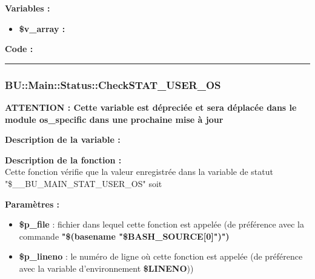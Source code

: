 \documentclass[a4paper,10pt]{article}
\begin{document}
\begin{justify}
    \textbf{Variables :}

    \begin{itemize}
        \item \textbf{\color{orange}\$v\_array\color{white} :}
    \end{itemize}
\end{justify}

\begin{justify}
    \textbf{Code :}
\end{justify}



\color{blue}\par\noindent\rule{\textwidth}{0.4pt}\color{white}

\color{blue}
\subsubsection{\color{mauve}BU::Main::Status::CheckSTAT\_USER\_OS}\color{white}

\textbf{ATTENTION : Cette variable est dépreciée et sera déplacée dans le module \textbf{\color{lime}os\_specific} dans une prochaine mise à jour}

\begin{justify}
    \textbf{Description de la variable :}\\
    
\end{justify}

\begin{justify}
    \textbf{Description de la fonction :}\\
    Cette fonction vérifie que la valeur enregistrée dans la variable de statut "\$\_\_BU\_MAIN\_STAT\_USER\_OS" soit
\end{justify}

\begin{justify}
    \textbf{Paramètres :}

    \begin{itemize}
        \item \color{orange}\textbf{\$p\_file}\color{white} : fichier dans lequel cette fonction est appelée (de préférence avec la commande \textbf{"\$(\color{gray}basename \color{white}"\color{orange}\$BASH\_SOURCE[0]\color{white}")")}\\

        \item \color{orange}\textbf{\$p\_lineno}\color{white} : le numéro de ligne où cette fonction est appelée (de préférence avec la variable d'environnement \textbf{\color{orange}\$LINENO}))
    \end{itemize}
\end{justify}
\end{document}
